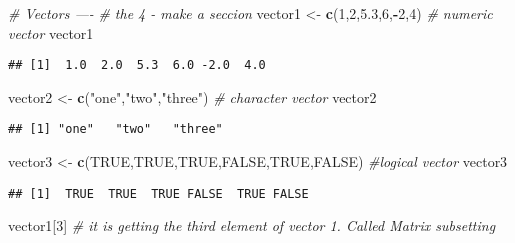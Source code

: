 \documentclass[]{article}
\newenvironment{Shaded}{\begin{snugshade}}{\end{snugshade}}
\newcommand{\KeywordTok}[1]{\textcolor[rgb]{0.13,0.29,0.53}{\textbf{#1}}}
\newcommand{\DecValTok}[1]{\textcolor[rgb]{0.00,0.00,0.81}{#1}}
\newcommand{\FloatTok}[1]{\textcolor[rgb]{0.00,0.00,0.81}{#1}}
\newcommand{\StringTok}[1]{\textcolor[rgb]{0.31,0.60,0.02}{#1}}
\newcommand{\CommentTok}[1]{\textcolor[rgb]{0.56,0.35,0.01}{\textit{#1}}}
\newcommand{\OtherTok}[1]{\textcolor[rgb]{0.56,0.35,0.01}{#1}}
\newcommand{\OperatorTok}[1]{\textcolor[rgb]{0.81,0.36,0.00}{\textbf{#1}}}
\newcommand{\NormalTok}[1]{#1}
\begin{document}
\begin{Shaded}
\begin{Highlighting}[]
\CommentTok{# Vectors ----}
\CommentTok{# the 4 - make a seccion}
\NormalTok{vector1 <-}\StringTok{ }\KeywordTok{c}\NormalTok{(}\DecValTok{1}\NormalTok{,}\DecValTok{2}\NormalTok{,}\FloatTok{5.3}\NormalTok{,}\DecValTok{6}\NormalTok{,}\OperatorTok{-}\DecValTok{2}\NormalTok{,}\DecValTok{4}\NormalTok{) }\CommentTok{# numeric vector}
\NormalTok{vector1}
\end{Highlighting}
\end{Shaded}

\begin{verbatim}
## [1]  1.0  2.0  5.3  6.0 -2.0  4.0
\end{verbatim}

\begin{Shaded}
\begin{Highlighting}[]
\NormalTok{vector2 <-}\StringTok{ }\KeywordTok{c}\NormalTok{(}\StringTok{"one"}\NormalTok{,}\StringTok{"two"}\NormalTok{,}\StringTok{"three"}\NormalTok{) }\CommentTok{# character vector}
\NormalTok{vector2}
\end{Highlighting}
\end{Shaded}

\begin{verbatim}
## [1] "one"   "two"   "three"
\end{verbatim}

\begin{Shaded}
\begin{Highlighting}[]
\NormalTok{vector3 <-}\StringTok{ }\KeywordTok{c}\NormalTok{(}\OtherTok{TRUE}\NormalTok{,}\OtherTok{TRUE}\NormalTok{,}\OtherTok{TRUE}\NormalTok{,}\OtherTok{FALSE}\NormalTok{,}\OtherTok{TRUE}\NormalTok{,}\OtherTok{FALSE}\NormalTok{) }\CommentTok{#logical vector}
\NormalTok{vector3}
\end{Highlighting}
\end{Shaded}

\begin{verbatim}
## [1]  TRUE  TRUE  TRUE FALSE  TRUE FALSE
\end{verbatim}

\begin{Shaded}
\begin{Highlighting}[]
\NormalTok{vector1[}\DecValTok{3}\NormalTok{] }\CommentTok{# it is getting the third element of vector 1. Called Matrix subsetting}
\end{Highlighting}
\end{Shaded}
\end{document}
